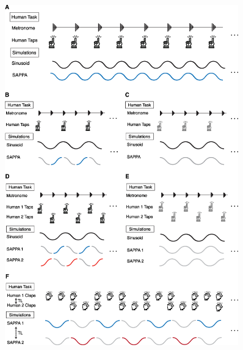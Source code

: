 \documentclass{report}
\begin{document}
\begin{figure}
    \centering
    \includegraphics[width=0.9\textwidth]{figures/fig2_1.png}
    \label{f2_1}
\end{figure}
\end{document}
